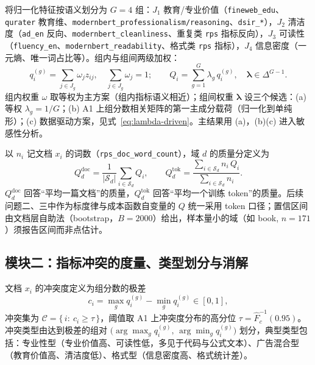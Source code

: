 \begin{definition}[分组评分与综合质量分]\label{def:composite}
将归一化特征按语义划分为 $G=4$ 组：$J_{1}$ 教育/专业价值（\texttt{fineweb\_edu}、\texttt{qurater} 教育维、\texttt{modernbert\_professionalism/reasoning}、\texttt{dsir\_*}），$J_{2}$ 清洁度（\texttt{ad\_en} 反向、\texttt{modernbert\_cleanliness}、重复类 \texttt{rps} 指标反向），$J_{3}$ 可读性（\texttt{fluency\_en}、\texttt{modernbert\_readability}、格式类 \texttt{rps} 指标），$J_{4}$ 信息密度（一元熵、唯一词占比等）。组内与组间两级加权：
\begin{equation}
  q_i^{(g)}=\sum_{j\in J_g}\omega_j z_{ij},\quad
  \sum_{j\in J_g}\omega_j=1;\qquad
  Q_i=\sum_{g=1}^{G}\lambda_g\, q_i^{(g)},\quad
  \bm{\lambda}\in\Delta^{G-1}.
  \label{eq:composite}
\end{equation}
组内权重 $\omega$ 取等权为主方案（组内指标语义相近）；组间权重 $\bm{\lambda}$ 设三个候选：(a) 等权 $\lambda_g=1/G$；(b) A1 上组分数相关矩阵的第一主成分载荷（归一化到单纯形）；(c) 数据驱动方案，见式~\eqref{eq:lambda-driven}。主结果用 (a)，(b)(c) 进入敏感性分析。
\end{definition}

\begin{definition}[域级质量分的双口径]\label{def:domain-q}
以 $n_i$ 记文档 $x_i$ 的词数（\texttt{rps\_doc\_word\_count}），域 $d$ 的质量分定义为
\begin{equation}
  Q_d^{\mathrm{doc}}=\frac{1}{|\mathcal{S}_d|}\sum_{i\in\mathcal{S}_d}Q_i,
  \qquad
  Q_d^{\mathrm{tok}}=\frac{\sum_{i\in\mathcal{S}_d} n_i\,Q_i}{\sum_{i\in\mathcal{S}_d} n_i}.
  \label{eq:domain-q}
\end{equation}
$Q_d^{\mathrm{doc}}$ 回答“平均一篇文档”的质量，$Q_d^{\mathrm{tok}}$ 回答“平均一个训练 token”的质量。后续问题二、三中作为标度律与成本函数自变量的 $Q$ 统一采用 token 口径；置信区间由文档层自助法（bootstrap，$B=2000$）给出，样本量小的域（如 book, $n=171$）须报告区间而非点估计。
\end{definition}

\subsection{模块二：指标冲突的度量、类型划分与消解}\label{sec:p1-conflict}

\begin{definition}[冲突度与冲突集]\label{def:conflict}
文档 $x_i$ 的冲突度定义为组分数的极差
\begin{equation}
  c_i=\max_{g} q_i^{(g)}-\min_{g} q_i^{(g)}\in[0,1],
  \label{eq:conflict}
\end{equation}
冲突集为 $\mathcal{C}=\{\,i:\ c_i\ge \tau\,\}$，阈值取 A1 上冲突度分布的高分位 $\tau=\widehat F_c^{-1}(0.95)$。冲突类型由达到极差的组对 $\bigl(\arg\max_g q_i^{(g)},\,\arg\min_g q_i^{(g)}\bigr)$ 划分，典型类型包括：专业性型（专业价值高、可读性低，多见于代码与公式文本）、广告混合型（教育价值高、清洁度低）、格式型（信息密度高、格式统计差）。
\end{definition}

